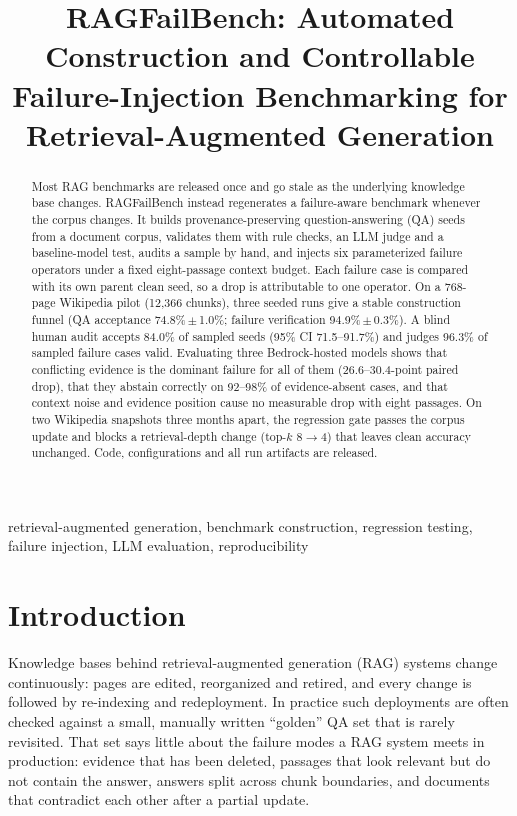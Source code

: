 \documentclass[conference]{IEEEtran}
\begin{document}
\title{RAGFailBench: Automated Construction and Controllable Failure-Injection Benchmarking for Retrieval-Augmented Generation}

\author{
}

\maketitle

\begin{abstract}
Most RAG benchmarks are released once and go stale as the underlying knowledge base changes.
RAGFailBench instead regenerates a failure-aware benchmark whenever the corpus changes. It
builds provenance-preserving question-answering (QA) seeds from a document corpus, validates
them with rule checks, an LLM judge and a baseline-model test, audits a sample by hand, and
injects six parameterized failure operators under a fixed eight-passage context budget. Each
failure case is compared with its own parent clean seed, so a drop is attributable to one
operator. On a 768-page Wikipedia pilot (12,366 chunks), three seeded runs give a stable
construction funnel (QA acceptance 74.8\%\,$\pm$\,1.0\%; failure verification 94.9\%\,$\pm$\,0.3\%).
A blind human audit accepts 84.0\% of sampled seeds (95\% CI 71.5--91.7\%) and judges 96.3\% of
sampled failure cases valid. Evaluating three Bedrock-hosted models shows that conflicting
evidence is the dominant failure for all of them (26.6--30.4-point paired drop), that they
abstain correctly on 92--98\% of evidence-absent cases, and that context noise and evidence
position cause no measurable drop with eight passages. On two Wikipedia snapshots three months
apart, the regression gate passes the corpus update and blocks a retrieval-depth change
(top-$k$ 8$\to$4) that leaves clean accuracy unchanged. Code, configurations and all run
artifacts are released.
\end{abstract}

\begin{IEEEkeywords}
retrieval-augmented generation, benchmark construction, regression testing, failure injection, LLM evaluation, reproducibility
\end{IEEEkeywords}

\section{Introduction}
Knowledge bases behind retrieval-augmented generation (RAG) systems change continuously: pages
are edited, reorganized and retired, and every change is followed by re-indexing and
redeployment. In practice such deployments are often checked against a small, manually written
``golden'' QA set that is rarely revisited. That set says little about the failure modes a RAG
system meets in production: evidence that has been deleted, passages that look relevant but do
not contain the answer, answers split across chunk boundaries, and documents that contradict
each other after a partial update.
\end{document}
